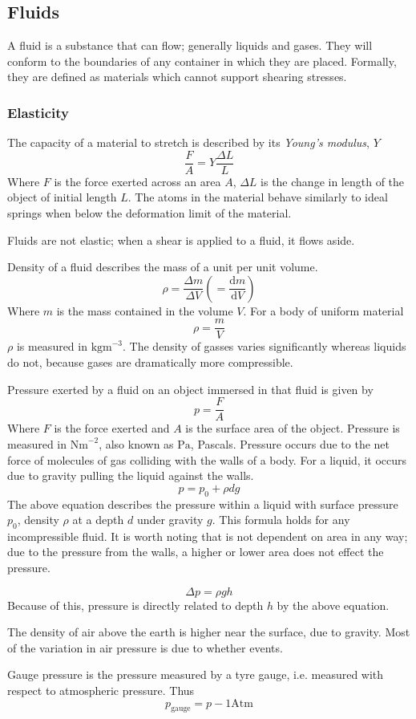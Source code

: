 \documentclass[12pt]{report}
\begin{document}
\begin{flushleft}
\section*{Fluids}

A fluid is a substance that can flow; generally liquids and gases. They will
conform to the boundaries of any container in which they are placed. Formally,
they are defined as materials which cannot support shearing stresses.

\subsubsection*{Elasticity}

The capacity of a material to stretch is described by its \textit{Young's
modulus}, \(Y\)
\[\frac{F}{A} = Y\frac{\Delta L}{L}\]
Where \(F\) is the force exerted across an area \(A\), \(\Delta L\) is the
change in length of the object of initial length \(L\). The atoms in the
material behave similarly to ideal springs when below the deformation limit of
the material. \par
Fluids are not elastic; when a shear is applied to a fluid, it flows aside.

\bigskip
Density of a fluid describes the mass of a unit per unit volume.
\[\rho = \frac{\Delta m}{\Delta V} 
\left(=\frac{\mathrm{d}m}{\mathrm{d}V}\right)\]
Where \(m\) is the mass contained in the volume \(V\). For a body of uniform
material
\[\rho = \frac{m}{V}\]
\(\rho\) is measured in \(\mathrm{kgm}^{-3}\). The density of gasses varies
significantly whereas liquids do not, because gases are dramatically more
compressible.

\bigskip
Pressure exerted by a fluid on an object immersed in that fluid is given by
\[p = \frac{F}{A}\]
Where \(F\) is the force exerted and \(A\) is the surface area of the object.
Pressure is measured in \(\mathrm{Nm}^{-2}\), also known as \(\mathrm{Pa}\),
Pascals. Pressure occurs due to the net force of molecules of gas colliding
with the walls of a body. For a liquid, it occurs due to gravity pulling the
liquid against the walls.
\[p = p_0 + \rho dg\]
The above equation describes the pressure within a liquid with surface pressure
\(p_0\), density \(\rho\) at a depth \(d\) under gravity \(g\). This formula
holds for any incompressible fluid. It is worth noting that is not dependent on
area in any way; due to the pressure from the walls, a higher or lower area
does not effect the pressure. \par
\[\Delta p = \rho gh\]
Because of this, pressure is directly related to depth \(h\) by the above
equation. \par
The density of air above the earth is higher near the surface, due to gravity.
Most of the variation in air pressure is due to whether events. \par
Gauge pressure is the pressure measured by a tyre gauge, i.e. measured with
respect to atmospheric pressure. Thus
\[p_\mathrm{gauge} = p - 1\mathrm{Atm}\]


\end{flushleft}
\end{document}

